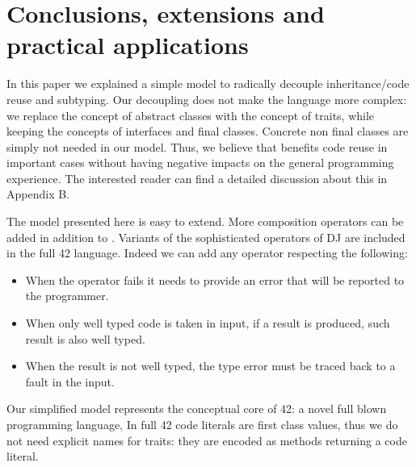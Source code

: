\saveSpace\saveSpace
\section{Conclusions, extensions and practical applications}
\saveSpace
In this paper we explained a simple model to 
radically decouple inheritance/code reuse and subtyping.
Our decoupling does not
make the language more complex:
we replace the concept of abstract classes with
the concept of traits, while keeping the concepts of
interfaces and final classes.
Concrete non final classes are simply not needed in our model.
Thus, we believe that \name benefits
code reuse in important cases 
without having negative impacts on the general programming experience.
The interested reader can find a detailed discussion about this in Appendix B.

The model presented here is easy to extend.
More composition operators can be added in addition to \use.
Variants of the sophisticated operators of DJ are
included in the full 42 language.
 Indeed we can add any operator respecting the following:

\begin{itemize}
\item When the operator fails it needs to provide an error that will be reported to the programmer.
\item When only well typed code is taken in input, if a result is produced,
 such result is also well typed.
\item When the result is not well typed,
the type error must be traced back to
a fault in the input.
 \end{itemize}
 

Our simplified model represents the conceptual core of  42: a novel full blown programming language,
In full 42 code literals are first class values, thus we
do not need explicit names
for traits: they are encoded as methods
 returning a code literal.

\begin{comment}
using the ideas presented in this paper to obtain reliable and understandable metaprogramming.
Formalization (in progress) for full 42 can be found at
\url{http://}\footnote{Omitted for anonymous review}. 
42 extends our model allowing
flattening to execute arbitrary computations.
In such model we do not need an explicit notion of traits: they are encoded as methods returning a code literal.
42 also has features less related to code composition, like
  a strong type system supporting aliasing mutability and circularity control,
   checked exceptions, and errors (unchecked exceptions) with strong-exception-safety.


42 do not have a finite set of composition operators; they can be
added using the built in support for native method calls. They can
be dynamically checked to verify that they are well behaved
according to our predicate, or they can be trusted to achieve
efficiency.
\end{comment}

